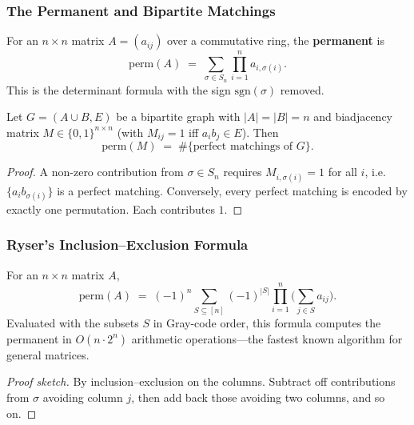 \subsubsection{The Permanent and Bipartite Matchings}

\begin{definition}[Permanent]\label{def:permanent}
For an $n \times n$ matrix $A = (a_{ij})$ over a commutative ring,
the \textbf{permanent} is
\[
  \mathrm{perm}(A) \;=\; \sum_{\sigma \in S_n} \prod_{i = 1}^{n} a_{i, \sigma(i)}.
\]
This is the determinant formula with the sign $\mathrm{sgn}(\sigma)$
removed.
\end{definition}

\begin{theorem}\label{thm:permmatch}
Let $G = (A \cup B, E)$ be a bipartite graph with $|A| = |B| = n$ and
biadjacency matrix $M \in \{0, 1\}^{n \times n}$ (with $M_{ij} = 1$
iff $a_i b_j \in E$). Then
\[
  \mathrm{perm}(M) \;=\; \#\{\text{perfect matchings of } G\}.
\]
\end{theorem}

\begin{proof}
A non-zero contribution from $\sigma \in S_n$ requires
$M_{i, \sigma(i)} = 1$ for all $i$, i.e.\ $\{a_i b_{\sigma(i)}\}$ is
a perfect matching. Conversely, every perfect matching is encoded by
exactly one permutation. Each contributes $1$.
\end{proof}

\subsubsection{Ryser's Inclusion--Exclusion Formula}

\begin{theorem}[Ryser, 1963]\label{thm:ryser}
For an $n \times n$ matrix $A$,
\[
  \mathrm{perm}(A) \;=\; (-1)^n \sum_{S \subseteq [n]} (-1)^{|S|} \prod_{i = 1}^{n} \Big(\sum_{j \in S} a_{ij}\Big).
\]
Evaluated with the subsets $S$ in Gray-code order, this formula
computes the permanent in $O(n \cdot 2^n)$ arithmetic
operations---the fastest known algorithm for general matrices.
\end{theorem}

\begin{proof}[Proof sketch]
By inclusion--exclusion on the columns. Subtract off contributions
from $\sigma$ avoiding column $j$, then add back those avoiding two
columns, and so on.
\end{proof}

